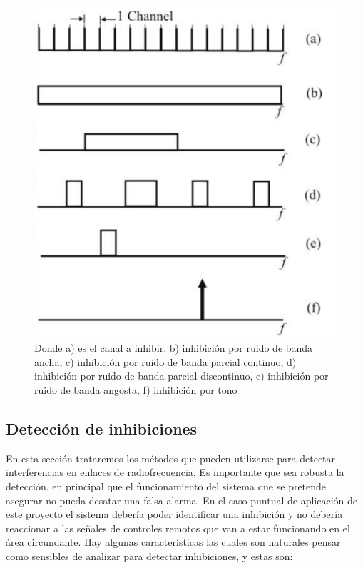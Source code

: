 \documentclass[12pt]{report}
\begin{document}
\begin{figure}[htb]
	\centering
	\includegraphics[scale=0.8]{tipos_de_jam.png}
    \caption{Donde a) es el canal a inhibir, b) inhibición por ruido de banda ancha, c) inhibición por ruido de banda parcial continuo, 
    d) inhibición por ruido de banda parcial discontinuo, e) inhibición por ruido de banda angosta, f) inhibición por tono }
	\label{tipos_de_jam}
\end{figure}


\subsection{Detección de inhibiciones}

En esta sección trataremos los métodos que pueden utilizarse para detectar interferencias en enlaces de radiofrecuencia. Es importante que 
sea robusta la detección, en principal que el funcionamiento del sistema que se pretende asegurar no pueda desatar una falsa alarma. En el caso
puntual de aplicación de este proyecto el sistema debería poder identificar una inhibición y no debería reaccionar a las señales de controles 
remotos que van a estar funcionando en el área circundante.
Hay algunas características las cuales son naturales pensar como sensibles de analizar para detectar inhibiciones, y estas son: 
\end{document}
